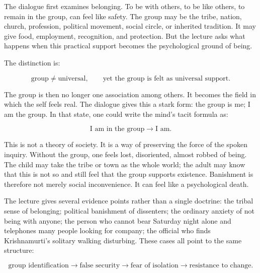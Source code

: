 \documentclass[11pt,oneside]{book}
\begin{document}
The dialogue first examines belonging. To be with others, to be like others, to remain in the group, can feel like safety. The group may be the tribe, nation, church, profession, political movement, social circle, or inherited tradition. It may give food, employment, recognition, and protection. But the lecture asks what happens when this practical support becomes the psychological ground of being.

The distinction is:

\begin{equation}
\text{group} \neq \text{universal},
\qquad
\text{yet the group is felt as universal support}.
\end{equation}

The group is then no longer one association among others. It becomes the field in which the self feels real. The dialogue gives this a stark form: the group is me; I am the group. In that state, one could write the mind's tacit formula as:

\begin{equation}
\text{I am in the group}
\longrightarrow
\text{I am}.
\end{equation}

This is not a theory of society. It is a way of preserving the force of the spoken inquiry. Without the group, one feels lost, disoriented, almost robbed of being. The child may take the tribe or town as the whole world; the adult may know that this is not so and still feel that the group supports existence. Banishment is therefore not merely social inconvenience. It can feel like a psychological death.

The lecture gives several evidence points rather than a single doctrine: the tribal sense of belonging; political banishment of dissenters; the ordinary anxiety of not being with anyone; the person who cannot bear Saturday night alone and telephones many people looking for company; the official who finds Krishnamurti's solitary walking disturbing. These cases all point to the same structure:

\begin{equation}
\text{group identification}
\longrightarrow
\text{false security}
\longrightarrow
\text{fear of isolation}
\longrightarrow
\text{resistance to change}.
\end{equation}
\end{document}
